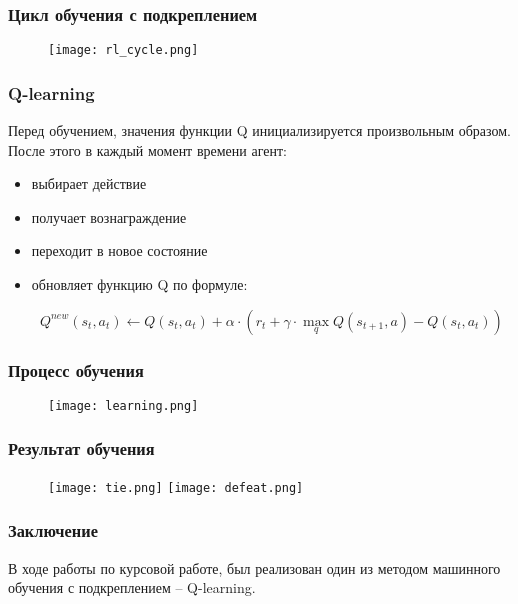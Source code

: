 \documentclass{beamer}
\begin{document}
\begin{frame}
    \frametitle{Цикл обучения с подкреплением}

    \begin{figure}
        \texttt{[image: rl\_cycle.png]}
    \end{figure}
    
\end{frame}

\begin{frame}
    \frametitle{Q-learning}

    Перед обучением, значения функции Q инициализируется произвольным образом. После этого в каждый момент времени  агент:

    \begin{itemize}
        \item выбирает действие 
        \item получает вознаграждение 
        \item переходит в новое состояние 
        \item обновляет функцию Q по формуле:
        
        \begin{equation*}
            Q^{new}(s_t, a_t) \leftarrow Q(s_t, a_t) 
            + \alpha \cdot
            \left(
            r_t + \gamma \cdot \max_q Q (s_{t+1}, a) - Q(s_t, a_t)
            \right)
        \end{equation*}

    \end{itemize}

\end{frame}

\begin{frame}
    \frametitle{Процесс обучения}

    \begin{figure}
        \texttt{[image: learning.png]}
    \end{figure}
\end{frame}

\begin{frame}
    \frametitle{Результат обучения}

    \begin{figure}
        \texttt{[image: tie.png]}
        \hfill
        \texttt{[image: defeat.png]}
    \end{figure}
\end{frame}

\begin{frame}
    \frametitle{Заключение}

    В ходе работы по курсовой работе, был реализован один из методом машинного обучения с подкреплением – Q-learning.
\end{frame}
\end{document}

